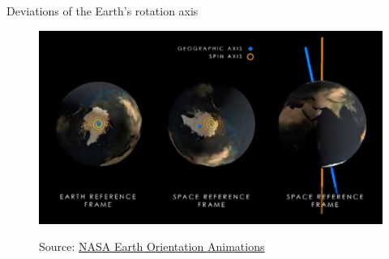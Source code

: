 \documentclass{beamer} %
\begin{document}
\begin{frame}{Deviations of the Earth's rotation axis}
\begin{minipage}{0.49\textwidth}
\begin{figure}
{        \includegraphics[width=\textwidth, keepaspectratio]{../Images/polarMotion_video_frame.png}
      }
      \vspace{-0.5cm}
      \caption{\tiny Source: \href{https://svs.gsfc.nasa.gov/20196}{NASA Earth Orientation Animations}}
    \end{figure}
  \end{minipage}
\end{frame}
\end{document}

